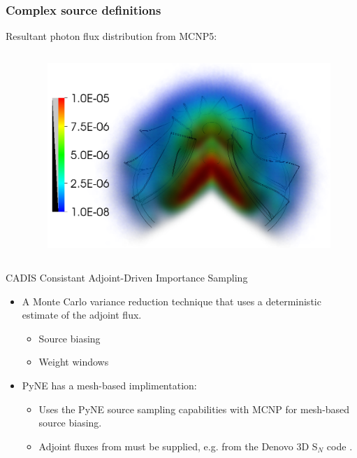 \documentclass[xcolor=x11names,compress]{beamer}
\begin{document}
\begin{frame}
\frametitle{Complex source definitions}
Resultant photon flux distribution from MCNP5:
\begin{columns}[c]

\centering
\begin{column}{0.1\textwidth}
\end{column}

\begin{column}{0.8\textwidth}
\hspace{-0.85cm}
\centerline{\includegraphics[height=7cm]{turbine_flux.png}}
\end{column}
\end{columns}

\end{frame}

\begin{frame}{CADIS}
Consistant Adjoint-Driven Importance Sampling \cite{haghighat_monte_2003}
    \begin{itemize}
        \item{A Monte Carlo variance reduction technique that uses a deterministic estimate of the adjoint flux.}
        \begin{itemize}
            \item{Source biasing}
            \item{Weight windows}
        \end{itemize}
        \item{PyNE has a mesh-based implimentation:}
        \begin{itemize}
            \item{Uses the PyNE source sampling capabilities with MCNP for mesh-based source biasing.}
            \item{Adjoint fluxes from must be supplied, e.g. from the Denovo 3D S$_N$ code \cite{Evans2010}.}
        \end{itemize}    
    \end{itemize}
\end{frame}
\end{document}
